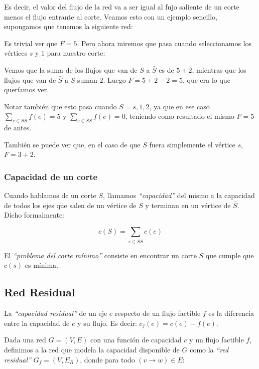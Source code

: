 Es decir, el valor del flujo de la red va a ser igual al fujo saliente de un corte menos el flujo entrante al corte. Veamos esto con un ejemplo sencillo, supongamos que tenemos la siguiente red:

\begin{figure}[htb]
    \centering
    
\end{figure}

Es trivial ver que $F = 5$. Pero ahora miremos que pasa cuando seleccionamos los v\'ertices $s$ y $1$ para nuestro corte:

\begin{figure}[htb]
    \centering
    
\end{figure}

Vemos que la suma de los flujos que van de $S$ a $\bar{S}$ es de $5 + 2$, mientras que los flujos que van de $\bar{S}$ a $S$ suman $2$. Luego $F = 5 + 2 - 2 = 5$, que era lo que quer\'iamos ver.

Notar tambi\'en que esto pasa cuando $S = {s, 1, 2}$, ya que en ese caso $\sum_{e \in S\bar{S}} f(e) = 5$ y $\sum_{e \in \bar{S}S} f(e) = 0$, teniendo como resultado el mismo $F = 5$ de antes.

Tambi\'en se puede ver que, en el caso de que $S$ fuera simplemente el v\'ertice $s$, $F = 3+2$.

\subsubsection{Capacidad de un corte}

Cuando hablamos de un corte $S$, llamamos \emph{``capacidad''} del mismo a la capacidad de todos los ejes que salen de un v\'ertice de $S$ y terminan en un v\'ertice de $\bar{S}$. Dicho formalmente:

\[
c(S) = \sum_{e \in S\bar{S}} c(e)
\]

El \emph{``problema del corte m\'inimo''} consiste en encontrar un corte $S$ que cumple que $c(s)$ es m\'inima.

\subsection{Red Residual}

La \emph{``capacidad residual''} de un eje $e$ respecto de un flujo factible $f$ es la diferencia entre la capacidad de $e$ y su flujo. Es decir: $c_f(e) = c(e) - f(e)$.

Dada una red $G = (V, E)$ con una funci\'on de capacidad $c$ y un flujo factible $f$, definimos a la red que modela la capacidad disponible de $G$ como la \emph{``red residual''} $G_f = (V, E_{R})$, donde para todo $(v \rightarrow w) \in E$:

